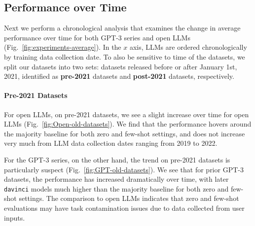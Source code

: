 \documentclass[letterpaper]{article} %
\newcommand{\nilay}[1]{}
\newcommand{\jmf}[1]{}      %
\begin{document}
\nilay{I don't quite understand why this section is separate from the previous one. I would merge them into one, and reverse the order so it reads like this: (1) for each LLM, it's more likely to outperform baseline on pre-collection datasets. (2) totalled across all LLMs and datasets, we find the likelihood of any given LLM outperforming baseline on any pre-collection dataset to be stat. sig. more than any post-collection. In my head that order sounds more natural. }


\subsection{Performance over Time}

Next we perform a chronological analysis that examines the change in average performance over time for both GPT-3 series and open LLMs (Fig.~\ref{fig:experiments-average}).\jmf{add summary of results} In the $x$ axis, LLMs are ordered chronologically by training data collection date. To also be sensitive to time of the datasets, we split our datasets into two sets:
datasets released before or after January 1st, 2021, identified as \textbf{pre-2021} datasets and \textbf{post-2021} datasets, respectively.

\paragraph{Pre-2021 Datasets}
For open LLMs, on pre-2021 datasets, we see a slight increase over time for open LLMs (Fig.~\ref{fig:Open-old-datasets}).  We find that the performance hovers around the majority baseline for both zero and few-shot settings, and does not increase very much from LLM data collection dates ranging from 2019 to 2022.

For the GPT-3 series, on the other hand, the trend on pre-2021 datasets is particularly suspect (Fig.~\ref{fig:GPT-old-datasets}).  We see that for prior GPT-3 datasets, the performance has increased dramatically over time, with later \texttt{davinci} models much higher than the majority baseline for both zero and few-shot settings.  The comparison to open LLMs indicates that zero and few-shot evaluations may have task contamination issues due to data collected from user inputs.
\end{document}
